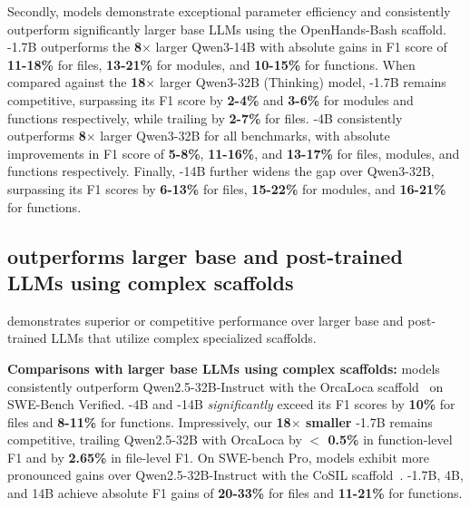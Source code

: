 Secondly, \methodname models demonstrate exceptional parameter efficiency and consistently outperform significantly larger base LLMs using the OpenHands-Bash scaffold. \methodname-1.7B outperforms the \textbf{8$\times$} larger Qwen3-14B with absolute gains in F1 score of \textbf{11-18\%} for files, \textbf{13-21\%} for modules, and \textbf{10-15\%} for functions. When compared against the \textbf{18$\times$} larger Qwen3-32B (Thinking) model, \methodname-1.7B remains competitive, surpassing its F1 score by \textbf{2-4\%} and \textbf{3-6\%} for modules and functions respectively, while trailing by \textbf{2-7\%} for files. \methodname-4B consistently outperforms \textbf{8$\times$} larger Qwen3-32B for all benchmarks, with absolute improvements in F1 score of \textbf{5-8\%}, \textbf{11-16\%}, and \textbf{13-17\%} for files, modules, and functions respectively. Finally, \methodname-14B further widens the gap over Qwen3-32B, surpassing its F1 scores by \textbf{6-13\%} for files, \textbf{15-22\%} for modules, and \textbf{16-21\%} for functions.

\subsection{\methodname outperforms larger base and post-trained LLMs using complex scaffolds}

\methodname demonstrates superior or competitive performance over larger base and post-trained LLMs that utilize complex specialized scaffolds.

\textbf{Comparisons with larger base LLMs using complex scaffolds:} \methodname models consistently outperform Qwen2.5-32B-Instruct with the OrcaLoca scaffold~\citep{yu2025orcalocallmagentframework} on SWE-Bench Verified. \methodname-4B and \methodname-14B \emph{significantly} exceed its F1 scores by \textbf{10\%} for files and \textbf{8-11\%} for functions. Impressively, our \textbf{18$\times$ smaller} \methodname-1.7B remains  competitive, trailing Qwen2.5-32B with OrcaLoca by \textbf{$<$ 0.5\%} in function-level F1 and by \textbf{2.65\%} in file-level F1. On SWE-bench Pro, \methodname models exhibit more pronounced gains over Qwen2.5-32B-Instruct with the CoSIL scaffold~\citep{jiang2025issuelocalizationllmdriveniterative}. \methodname-1.7B, 4B, and 14B achieve absolute F1 gains of \textbf{20-33\%} for files and \textbf{11-21\%} for functions. 



